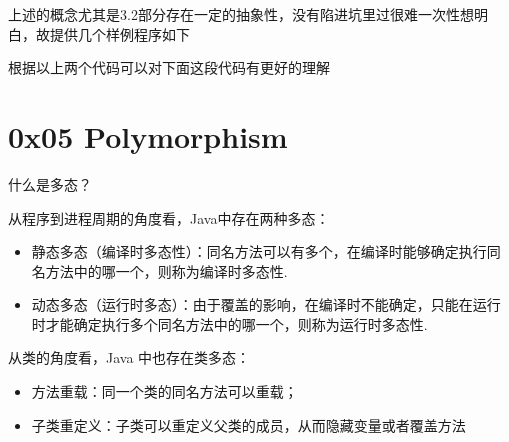 上述的概念尤其是3.2部分存在一定的抽象性，没有陷进坑里过很难一次性想明白，故提供几个样例程序如下





根据以上两个代码可以对下面这段代码有更好的理解


\section{0x05 Polymorphism}

什么是多态？

从程序到进程周期的角度看，Java中存在两种多态：

\begin{itemize}
    \item 静态多态（编译时多态性）：同名方法可以有多个，在编译时能够确定执行同名方法中的哪一个，则称为编译时多态性.
    \item 动态多态（运行时多态）：由于覆盖的影响，在编译时不能确定，只能在运行时才能确定执行多个同名方法中的哪一个，则称为运行时多态性.
\end{itemize}

从类的角度看，Java 中也存在类多态：

\begin{itemize}
    \item 方法重载：同一个类的同名方法可以重载；
    \item 子类重定义：子类可以重定义父类的成员，从而隐藏变量或者覆盖方法
\end{itemize}